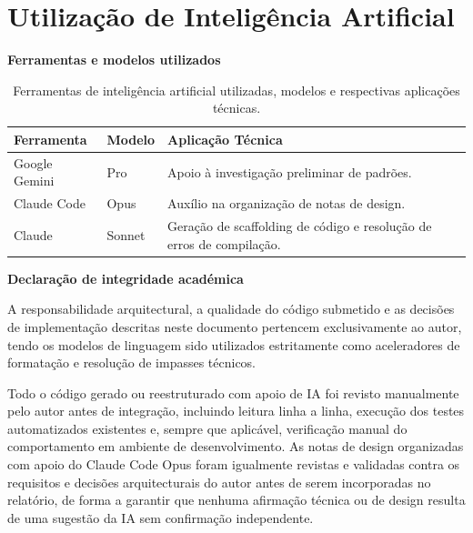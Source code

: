 %
%
\chapter*{Utilização de Inteligência Artificial}
\label{cha:declaracao-ia}

\vspace{0.4cm}
\noindent\textbf{Ferramentas e modelos utilizados}

\begin{table}[htbp]
    \centering
    \small
    \begin{tabular}{p{3.0cm} p{2.5cm} p{8.0cm}}
        \toprule
        \textbf{Ferramenta} & \textbf{Modelo} & \textbf{Aplicação Técnica} \\
        \midrule
        Google Gemini & Pro    & Apoio à investigação preliminar de padrões. \\
        \addlinespace
        Claude Code   & Opus   & Auxílio na organização de notas de design. \\
        \addlinespace
        Claude        & Sonnet & Geração de scaffolding de código e resolução de erros de compilação. \\
        \bottomrule
    \end{tabular}
    \caption[Ferramentas de IA utilizadas no desenvolvimento]{Ferramentas de inteligência artificial utilizadas, modelos e respectivas aplicações técnicas.}
    \label{tab:ferramentas-ia}
\end{table}

\vspace{0.4cm}
\noindent\textbf{Declaração de integridade académica}
\vspace{0.2cm}

A responsabilidade arquitectural, a qualidade do código submetido e as decisões de implementação descritas neste documento pertencem exclusivamente ao autor, tendo os modelos de linguagem sido utilizados estritamente como aceleradores de formatação e resolução de impasses técnicos.

Todo o código gerado ou reestruturado com apoio de IA foi revisto manualmente pelo autor antes de integração, incluindo leitura linha a linha, execução dos testes automatizados existentes e, sempre que aplicável, verificação manual do comportamento em ambiente de desenvolvimento. As notas de design organizadas com apoio do Claude Code Opus foram igualmente revistas e validadas contra os requisitos e decisões arquitecturais do autor antes de serem incorporadas no relatório, de forma a garantir que nenhuma afirmação técnica ou de design resulta de uma sugestão da IA sem confirmação independente.
